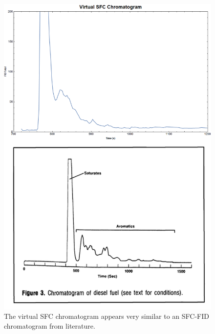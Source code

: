 \begin{figure}
	\centering
	\includegraphics[width=\textwidth]{Figures/VirtualSFC_Compared.png}
	\decoRule	
	
\caption[Comparing SFC-FID and virtual SFC.]{The virtual SFC chromatogram
appears very similar to an SFC-FID chromatogram from literature.}
	
	\label{fig:Virtual_SFC} 
\end{figure}



